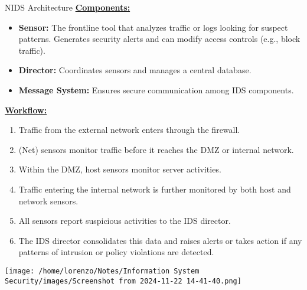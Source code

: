 \begin{quotebox-grey}{NIDS Architecture}
\underline{\textbf{Components:}}
\begin{itemize}
    \item \textbf{Sensor:} The frontline tool that analyzes traffic or logs looking for suspect patterns. Generates security alerts and can modify access controls (e.g., block traffic).
    \item \textbf{Director:} Coordinates sensors and manages a central database.
    \item \textbf{Message System:}  Ensures secure communication among IDS components.
\end{itemize}
\begin{minipage}{0.5\textwidth}
\underline{\textbf{Workflow:}}
\begin{enumerate}
    \item Traffic from the external network enters through the firewall.
    \item (Net) sensors monitor traffic before it reaches the DMZ or internal network.
    \item Within the DMZ, host sensors monitor server activities.
    \item Traffic entering the internal network is further monitored by both host and network sensors.
    \item All sensors report suspicious activities to the IDS director.
    \item The IDS director consolidates this data and raises alerts or takes action if any patterns of intrusion or policy violations are detected.
\end{enumerate}
\end{minipage} 
\hspace{0.2cm}
\begin{minipage}{0.5\textwidth}
    \centering
    \texttt{[image: /home/lorenzo/Notes/Information System Security/images/Screenshot from 2024-11-22 14-41-40.png]}
\end{minipage}
\end{quotebox-grey}

